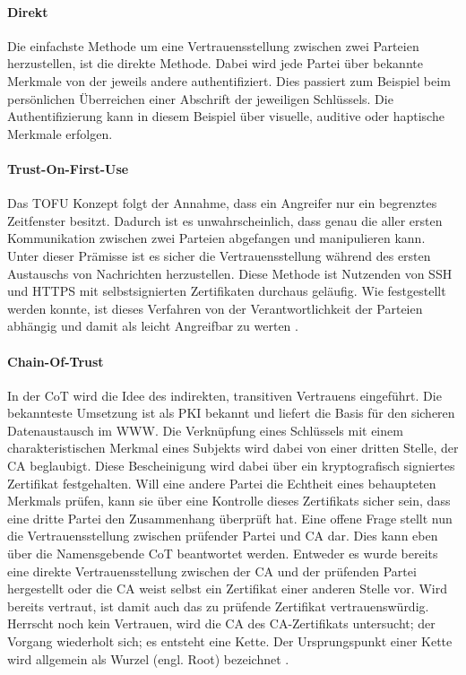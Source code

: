 \paragraph{Direkt}
Die einfachste Methode um eine Vertrauensstellung zwischen zwei Parteien herzustellen, ist die direkte Methode. Dabei wird jede Partei über bekannte Merkmale von der jeweils andere authentifiziert. Dies passiert zum Beispiel beim persönlichen Überreichen einer Abschrift der jeweiligen Schlüssels. Die Authentifizierung kann in diesem Beispiel über visuelle, auditive oder haptische Merkmale erfolgen.

\paragraph{Trust-On-First-Use}
Das \ac{TOFU} Konzept folgt der Annahme, dass ein Angreifer nur ein begrenztes Zeitfenster besitzt. Dadurch ist es unwahrscheinlich, dass genau die aller ersten Kommunikation zwischen zwei Parteien abgefangen und manipulieren kann. Unter dieser Prämisse ist es sicher die Vertrauensstellung während des ersten Austauschs von Nachrichten herzustellen. Diese Methode ist Nutzenden von \ac{SSH} und \acs{HTTPS} mit selbstsignierten Zertifikaten durchaus geläufig. Wie festgestellt werden konnte, ist dieses Verfahren von der Verantwortlichkeit der Parteien abhängig und damit als leicht Angreifbar zu werten \cite{Wendlandt2008}.

\paragraph{Chain-Of-Trust}
In der \ac{CoT} wird die Idee des indirekten, transitiven Vertrauens eingeführt. Die bekannteste Umsetzung ist als \ac{PKI} bekannt und liefert die Basis für den sicheren Datenaustausch im \ac{WWW}. Die Verknüpfung eines Schlüssels mit einem charakteristischen Merkmal eines Subjekts wird dabei von einer dritten Stelle, der \ac{CA} beglaubigt. Diese Bescheinigung wird dabei über ein kryptografisch signiertes Zertifikat festgehalten. Will eine andere Partei die Echtheit eines behaupteten Merkmals prüfen, kann sie über eine Kontrolle dieses Zertifikats sicher sein, dass eine dritte Partei den Zusammenhang überprüft hat. Eine offene Frage stellt nun die Vertrauensstellung zwischen prüfender Partei und \ac{CA} dar. Dies kann eben über die Namensgebende \ac{CoT} beantwortet werden. Entweder es wurde bereits eine direkte Vertrauensstellung zwischen der \ac{CA} und der prüfenden Partei hergestellt oder die \ac{CA} weist selbst ein Zertifikat einer anderen Stelle vor. Wird bereits vertraut, ist damit auch das zu prüfende Zertifikat vertrauenswürdig. Herrscht noch kein Vertrauen, wird die \ac{CA} des CA-Zertifikats untersucht; der Vorgang wiederholt sich; es entsteht eine Kette. Der Ursprungspunkt einer Kette wird allgemein als Wurzel (engl. Root) bezeichnet \cite[p. 423 ff.]{Eckert2013}.  
